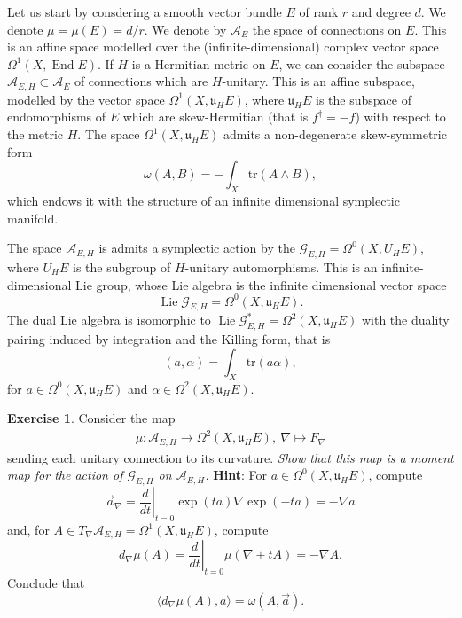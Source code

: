 \documentclass[12pt,a4paper]{amsbook}
\theoremstyle{remark} \newtheorem{rmk}[thm]{Remark}
\theoremstyle{definition} \newtheorem{defn}[thm]{Definition}
\theoremstyle{definition} \newtheorem{ex}[thm]{Example}
\theoremstyle{definition} \newtheorem{ej}{Exercise}
\let\emph\relax
\newcommand{\cA}{\mathcal A}
\newcommand{\cG}{\mathcal G}
\newcommand{\fu}{\mathfrak u}
\DeclareMathOperator{\End}{End}
\DeclareMathOperator{\Lie}{Lie}
\begin{document}
Let us start by consdering a smooth vector bundle $E$ of rank $r$ and degree $d$. We denote $\mu=\mu(E)=d/r$. We denote by $\cA_E$ the space of connections on  $E$. This is an affine space modelled over the (infinite-dimensional) complex vector space $\Omega^1(X,\End E)$. If $H$ is a Hermitian metric on $E$, we can consider the subspace $\cA_{E,H}\subset \cA_E$ of connections which are $H$-unitary. This is an affine subspace, modelled by the vector space $\Omega^1(X,\mathfrak{u}_H E)$, where $\mathfrak{u}_H E$ is the subspace of endomorphisms of $E$ which are skew-Hermitian (that is $f^\dagger = -f$) with respect to the metric $H$. The space $\Omega^1(X,\fu_H E)$ admits a non-degenerate skew-symmetric form
\begin{equation*}
\omega(A, B) = -\int_X \mathrm{tr}(A\wedge B),
\end{equation*}
which endows it with the structure of an infinite dimensional symplectic manifold.

The space  $\cA_{E,H}$ is admits a symplectic action by the \emph{unitary gauge group} $\cG_{E,H}=\Omega^0(X,U_H E)$, where $U_H E$ is the subgroup of  $H$-unitary automorphisms.
This is an infinite-dimensional Lie group, whose Lie algebra is the infinite dimensional vector space
\begin{equation*}
\Lie \cG_{E,H} = \Omega^0(X,\fu_H E).
\end{equation*}
The dual Lie algebra is isomorphic to $\Lie \cG_{E,H}^*=\Omega^2(X,\fu_H E)$ with the duality pairing induced by integration and the Killing form, that is
\begin{equation*}
(a,\alpha) = \int_X \mathrm{tr}(a \alpha),
\end{equation*}
for $a\in \Omega^0(X,\fu_H E)$ and $\alpha \in \Omega^2(X,\fu_H E)$.

\begin{ej}
Consider the map
\begin{align*}
\mu:\cA_{E,H}  \rightarrow  \Omega^2(X,\mathfrak{u}_H E),\ \nabla  \mapsto F_\nabla
\end{align*}
sending each unitary connection to its curvature. \textit{Show that this map is a moment map for the action of $\cG_{E,H}$ on $\cA_{E,H}$.} \textbf{Hint}: For $a\in \Omega^0(X,\fu_H E)$, compute
\begin{equation*}
\vec{a}_\nabla = \left. \frac{d}{dt} \right|_{t=0} \exp(ta) \nabla \exp(-ta) = -\nabla a
\end{equation*}
and, for $A\in T_\nabla \cA_{E,H}= \Omega^1(X,\fu_H E)$, compute
\begin{equation*}
d_\nabla \mu (A) = \left. \frac{d}{dt} \right|_{t=0} \mu(\nabla + tA) = -\nabla A.
\end{equation*}
Conclude that
\begin{equation*}
\langle d_\nabla \mu(A), a \rangle = \omega(A,\vec{a}).
\end{equation*}
\end{ej}
\end{document}
